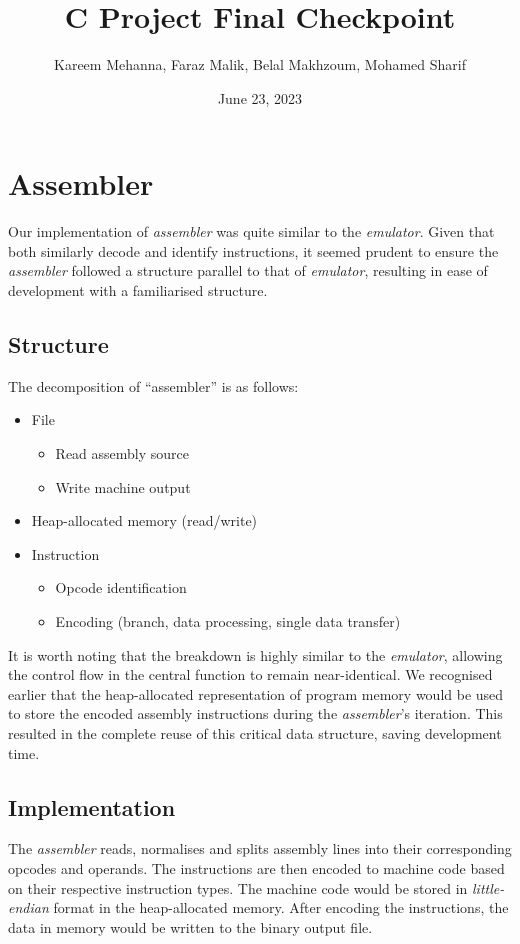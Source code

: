 \documentclass[11pt]{article}
\begin{document}
\title{C Project Final Checkpoint}
\author{Kareem Mehanna, Faraz Malik, Belal Makhzoum, Mohamed Sharif}
\date{June 23, 2023}

\maketitle

\section{Assembler}
Our implementation of {\it assembler} was quite similar to the {\it emulator}. Given that both similarly decode and identify instructions, it seemed prudent to ensure the {\it assembler} followed a structure parallel to that of  {\it emulator}, resulting in ease of development with a familiarised structure. 

\subsection{Structure}
The decomposition of “assembler” is as follows:
\begin{itemize}
\item File
    \begin{itemize}
    \item Read assembly source
    \item Write machine output
    \end{itemize}
\item Heap-allocated memory (read/write)
\item Instruction
    \begin{itemize}
    \item Opcode identification
    \item Encoding (branch, data processing, single data transfer)
    \end{itemize}
\end{itemize}

It is worth noting that the breakdown is highly similar to the {\it emulator}, allowing the control flow in the central function to remain near-identical. We recognised earlier that the heap-allocated  representation of program memory would be used to store the encoded assembly instructions during the {\it assembler}'s iteration. This resulted in the complete reuse of this critical data structure, saving development time.

\subsection{Implementation}
The {\it assembler} reads, normalises and splits assembly lines into their corresponding opcodes and operands. The instructions are then encoded to machine code based on their respective instruction types. The machine code would be stored in {\it little-endian} format in the heap-allocated memory. After encoding the instructions, the data in memory would be written to the binary output file.
\end{document}
